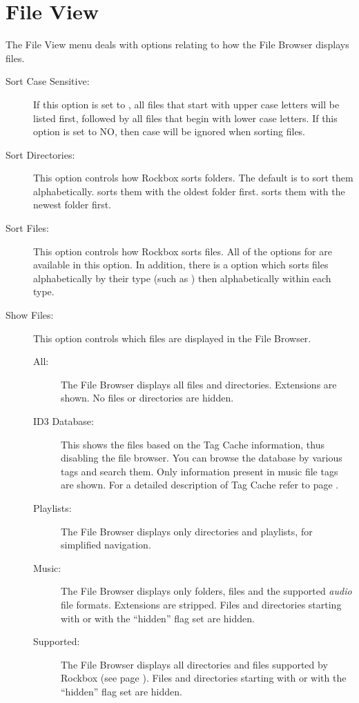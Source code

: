 \section{File View}
  The File View menu deals with options relating to how the File Browser 
  displays files.
  \begin{description}
  \item[Sort Case Sensitive:]
    If this option is set to , all files that start with upper case 
    letters will be listed first, followed by all files that begin with lower 
    case letters.  If this option is set to NO, then case will be ignored when 
    sorting files.
  \item[Sort Directories:]
    This option controls how Rockbox sorts folders.  The default is to sort 
    them alphabetically.  sorts them with the oldest folder first. 
     sorts them with the newest folder first.
    
  \item[Sort Files:]
    This option controls how Rockbox sorts files.  All of the options for 
     are available in this option.  In addition, there 
    is a  option which sorts files alphabetically by their type 
    (such as ) then alphabetically within each type.
    
  \item[\label{ref:ShowFiles}Show Files:]
    This option controls which files are displayed in the File Browser.
    \begin{description}
    \item[All:] The File Browser displays all files and directories. 
      Extensions are shown. No files or directories are hidden.
    \item[ID3 Database:] This shows the files based on the Tag Cache
      information, thus disabling the file browser. You can browse the
      database by various tags and search them. Only information present
      in music file tags are shown. For a detailed description of Tag Cache
      refer to page \pageref{ref:tagcache}.
    \item[Playlists:] The File Browser displays only directories and playlists,
      for simplified navigation.
    \item[Music:] The File Browser displays only folders,  files 
      and the supported \emph{audio} file formats.  Extensions are stripped.  
      Files and directories starting with  or with the ``hidden'' 
      flag set are hidden.
    \item[Supported:] The File Browser displays all directories and files 
      supported by Rockbox (see page \pageref{ref:Supportedfileformats}).  
      Files and directories starting with  or with the ``hidden'' 
      flag set are hidden.
    \end{description}
    

\end{description}

